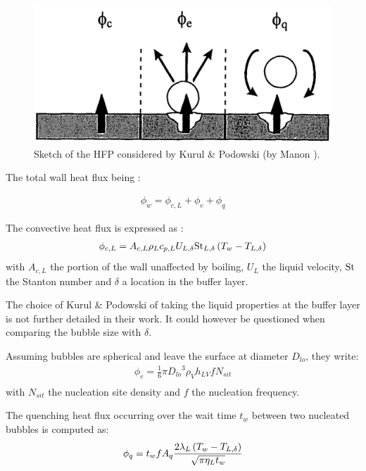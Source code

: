 \begin{figure}[!h]
\centering
\includegraphics[width=0.6\linewidth]{img/HFP/KP/KP_hfp.PNG}
\caption{Sketch of the HFP considered by Kurul \& Podowski (by Manon \cite{manon_contribution_2000}).}
\label{fig:KP_hfp}
\end{figure}

The total wall heat flux being :

\begin{align}
\phi_{w}=\phi_{c,L}+\phi_{e}+\phi_{q}
\end{align}

The convective heat flux is expressed as :
\begin{align}
\phi_{c,L}=A_{c,L} \rho_{L} c_{p,L}U_{L,\delta} \mathrm{St}_{L,\delta}\left( T_{w}-T_{L,\delta} \right)
\label{eq:KP_hfp_phicL}
\end{align}
with $A_{c,L}$ the portion of the wall unaffected by boiling, $U_{L}$ the liquid velocity, $\mathrm{St}$ the Stanton number and $\delta$ a location in the buffer layer.

\begin{note*}{}
The choice of Kurul \& Podowski of taking the liquid properties at the buffer layer is not further detailed in their work. It could however be questioned when comparing the bubble size with $\delta$.
\end{note*}


\npar
Assuming bubbles are spherical and leave the surface at diameter $D_{lo}$, they write:
\begin{align}
\phi_{e}=\frac{1}{6}\pi {D_{lo}}^{3}\rho_{V}h_{LV}fN_{sit}\\
\label{eq:KP_hfp_phie}
\end{align}
with $N_{sit}$ the nucleation site density and $f$ the nucleation frequency.

\npar
The quenching heat flux occurring over the wait time $t_{w}$ between two nucleated bubbles is computed as:  
\begin{align}
\phi_{q}=t_{w}fA_{q}\frac{2\lambda_{L}\left( T_{w}-T_{L,\delta} \right)}{\sqrt{\pi \eta_{L} t_{w}}}
\label{eq:KP_hfp_phiq}
\end{align}

